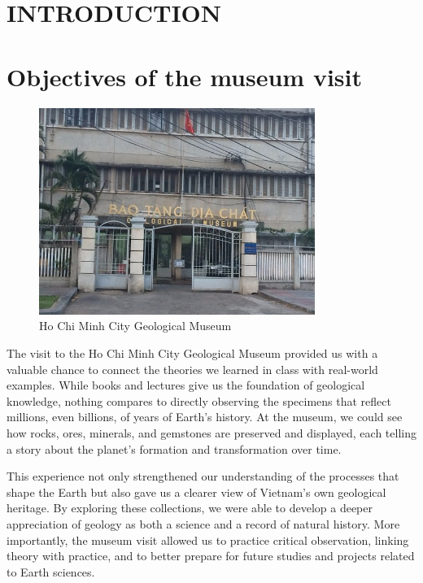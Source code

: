 \section{INTRODUCTION}
\label{chap:introduction}

\section{Objectives of the museum visit}
\label{sec:objectives}

\begin{figure}[H]
  \centering
  \includegraphics[width=0.8\textwidth]{graphics/figure_01.jpg}
  \caption{Ho Chi Minh City Geological Museum}
  \label{fig:museum}
\end{figure}

The visit to the Ho Chi Minh City Geological Museum provided us with a valuable chance to connect the theories we learned in class with real-world examples. While books and lectures give us the foundation of geological knowledge, nothing compares to directly observing the specimens that reflect millions, even billions, of years of Earth's history. At the museum, we could see how rocks, ores, minerals, and gemstones are preserved and displayed, each telling a story about the planet's formation and transformation over time.

This experience not only strengthened our understanding of the processes that shape the Earth but also gave us a clearer view of Vietnam's own geological heritage. By exploring these collections, we were able to develop a deeper appreciation of geology as both a science and a record of natural history. More importantly, the museum visit allowed us to practice critical observation, linking theory with practice, and to better prepare for future studies and projects related to Earth sciences.

